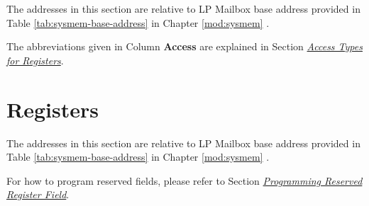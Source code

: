 \documentclass[main\_\_EN.tex]{subfiles}
\begin{document}
The addresses in this section are relative to LP Mailbox base address provided in Table \ref{tab:sysmem-base-address} in Chapter \ref{mod:sysmem} \textit{}.

The abbreviations given in Column \textbf{Access} are explained in Section \hyperref[glossary-access-types]{\textit{Access Types for Registers}}.




\section{Registers}

The addresses in this section are relative to LP Mailbox base address provided in Table \ref{tab:sysmem-base-address} in Chapter \ref{mod:sysmem} \textit{}.

For how to program reserved fields, please refer to Section \hyperref[programming-reserved-field]{\textit{Programming Reserved Register Field}}.


\end{document}

